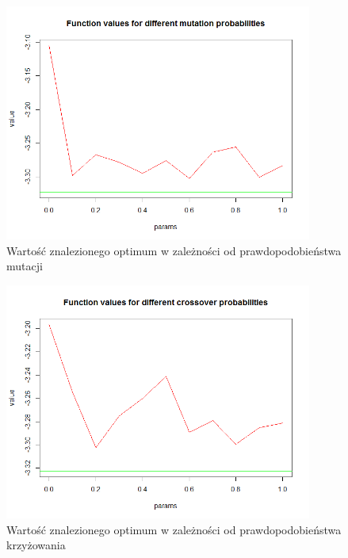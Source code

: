 \documentclass[11pt, a4paper]{article}
\begin{document}
\begin{figure}[H]
	\begin{center}
		\includegraphics[width=0.9\textwidth]{./assets/Hartman62.png} %
		\caption{Wartość znalezionego optimum w zależności od prawdopodobieństwa mutacji}
		\label{fig:gulf7}
	\end{center}
\end{figure}
\begin{figure}[H]
	\begin{center}
		\includegraphics[width=0.9\textwidth]{./assets/Hartman63.png} %
		\caption{Wartość znalezionego optimum w zależności od prawdopodobieństwa krzyżowania}
		\label{fig:gulf7}
	\end{center}
\end{figure}
\end{document}
